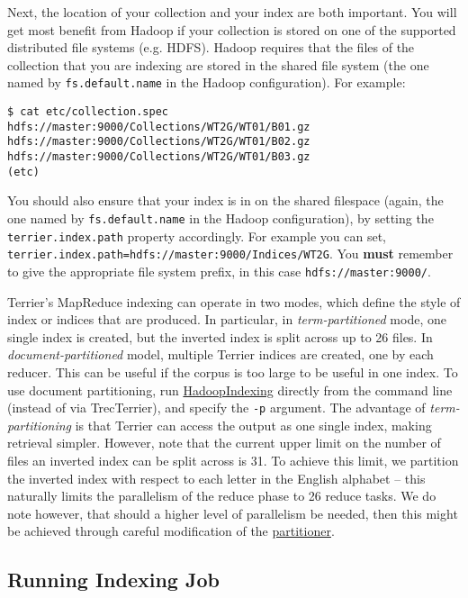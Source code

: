 Next, the location of your collection and your index are both important.
You will get most benefit from Hadoop if your collection is stored on
one of the supported distributed file systems (e.g. HDFS). Hadoop
requires that the files of the collection that you are indexing are
stored in the shared file system (the one named by
\texttt{fs.default.name} in the Hadoop configuration). For example:

\begin{verbatim}
$ cat etc/collection.spec
hdfs://master:9000/Collections/WT2G/WT01/B01.gz
hdfs://master:9000/Collections/WT2G/WT01/B02.gz
hdfs://master:9000/Collections/WT2G/WT01/B03.gz
(etc)
\end{verbatim}

You should also ensure that your index is in on the shared filespace
(again, the one named by \texttt{fs.default.name} in the Hadoop
configuration), by setting the \texttt{terrier.index.path} property
accordingly. For example you can set,
\texttt{terrier.index.path=hdfs://master:9000/Indices/WT2G}. You
\textbf{must} remember to give the appropriate file system prefix, in
this case \texttt{hdfs://master:9000/}.

Terrier's MapReduce indexing can operate in two modes, which define the
style of index or indices that are produced. In particular, in
\emph{term-partitioned} mode, one single index is created, but the
inverted index is split across up to 26 files. In
\emph{document-partitioned} model, multiple Terrier indices are created,
one by each reducer. This can be useful if the corpus is too large to be
useful in one index. To use document partitioning, run
\href{javadoc/org/terrier/applications/HadoopIndexing.html}{HadoopIndexing}
directly from the command line (instead of via TrecTerrier), and specify
the \texttt{-p} argument. The advantage of \emph{term-partitioning} is
that Terrier can access the output as one single index, making retrieval
simpler. However, note that the current upper limit on the number of
files an inverted index can be split across is 31. To achieve this
limit, we partition the inverted index with respect to each letter in
the English alphabet -- this naturally limits the parallelism of the
reduce phase to 26 reduce tasks. We do note however, that should a
higher level of parallelism be needed, then this might be achieved
through careful modification of the
\href{javadoc/org/terrier/structures/indexing/singlepass/hadoop/SplitEmittedTerm.html}{partitioner}.

\subsection{Running Indexing Job}\label{running-indexing-job}

